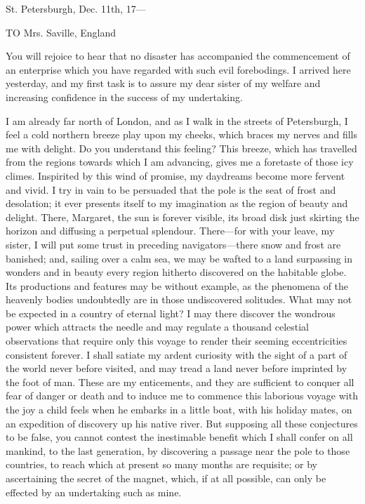 St. Petersburgh, Dec. 11th, 17---

TO Mrs. Saville, England

You will rejoice to hear that no disaster has accompanied the commencement of an enterprise which you have regarded with such evil forebodings. I arrived here yesterday, and my first task is to assure my dear sister of my welfare and increasing confidence in the success of my undertaking.

I am already far north of London, and as I walk in the streets of Petersburgh, I feel a cold northern breeze play upon my cheeks, which braces my nerves and fills me with delight. Do you understand this feeling? This breeze, which has travelled from the regions towards which I am advancing, gives me a foretaste of those icy climes. Inspirited by this wind of promise, my daydreams become more fervent and vivid. I try in vain to be persuaded that the pole is the seat of frost and desolation; it ever presents itself to my imagination as the region of beauty and delight. There, Margaret, the sun is forever visible, its broad disk just skirting the horizon and diffusing a perpetual splendour. There---for with your leave, my sister, I will put some trust in preceding navigators---there snow and frost are banished; and, sailing over a calm sea, we may be wafted to a land surpassing in wonders and in beauty every region hitherto discovered on the habitable globe. Its productions and features may be without example, as the phenomena of the heavenly bodies undoubtedly are in those undiscovered solitudes. What may not be expected in a country of eternal light? I may there discover the wondrous power which attracts the needle and may regulate a thousand celestial observations that require only this voyage to render their seeming eccentricities consistent forever. I shall satiate my ardent curiosity with the sight of a part of the world never before visited, and may tread a land never before imprinted by the foot of man. These are my enticements, and they are sufficient to conquer all fear of danger or death and to induce me to commence this laborious voyage with the joy a child feels when he embarks in a little boat, with his holiday mates, on an expedition of discovery up his native river. But supposing all these conjectures to be false, you cannot contest the inestimable benefit which I shall confer on all mankind, to the last generation, by discovering a passage near the pole to those countries, to reach which at present so many months are requisite; or by ascertaining the secret of the magnet, which, if at all possible, can only be effected by an undertaking such as mine.

